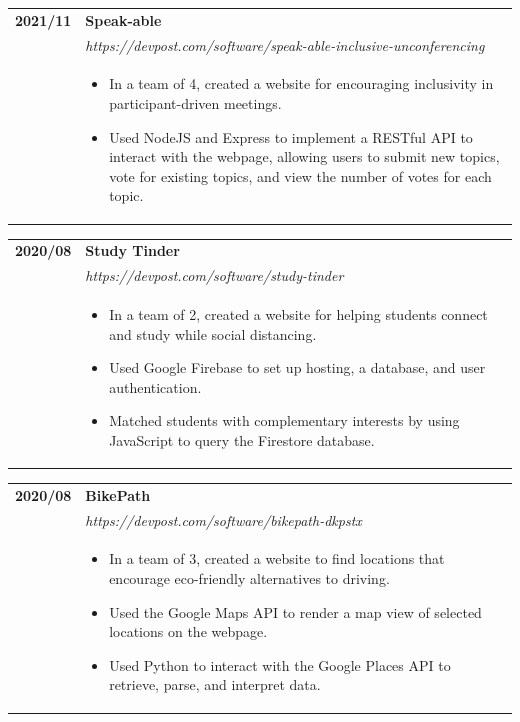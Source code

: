 \documentclass[letterpaper]{article}
\begin{document}
        \begin{tabular}{p{} p{}}
            \textbf{2021/11} & \textbf{Speak-able} \\
            & \emph{https://devpost.com/software/speak-able-inclusive-unconferencing} \\
            & \begin{itemize}
                \item In a team of 4, created a website for encouraging inclusivity in
                    participant-driven meetings.
                \item Used NodeJS and Express to implement a RESTful API to interact with the webpage,
                    allowing users to submit new topics, vote for existing topics, and view the number
                    of votes for each topic.
            \end{itemize}
        \end{tabular}

        \begin{tabular}{p{} p{}}
            \textbf{2020/08} & \textbf{Study Tinder} \\
            & \emph{https://devpost.com/software/study-tinder} \\
            & \begin{itemize}
                \item In a team of 2, created a website for helping students connect and study while
                    social distancing.
                \item Used Google Firebase to set up hosting, a database, and user authentication.
                \item Matched students with complementary interests by using JavaScript to query the
                    Firestore database.
            \end{itemize}
        \end{tabular}

        \begin{tabular}{p{} p{}}
            \textbf{2020/08} & \textbf{BikePath} \\
            & \emph{https://devpost.com/software/bikepath-dkpstx} \\
            & \begin{itemize}
                \item In a team of 3, created a website to find locations that encourage eco-friendly
                    alternatives to driving.
                \item Used the Google Maps API to render a map view of selected locations on the webpage.
                \item Used Python to interact with the Google Places API to retrieve, parse, and
                    interpret data.
            \end{itemize}
        \end{tabular}
\end{document}
